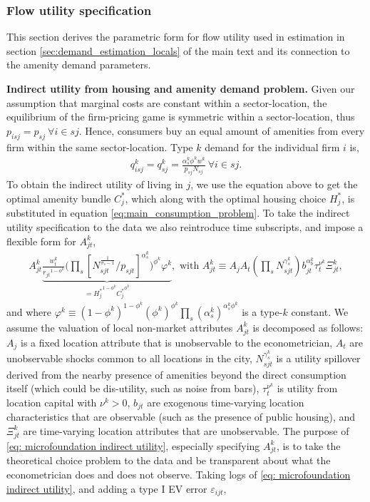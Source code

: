 \documentclass[11pt]{article}
\newcommand{\Paragraph}{\vspace{0.1cm}\noindent\textbf}
\begin{document}
\subsubsection{Flow utility specification}\label{sec: appendix microfoundation-flow utility}

This section derives the parametric form for flow utility used in estimation in section \ref{sec:demand_estimation_locals} of the main text and its connection to the amenity demand parameters.

\Paragraph{Indirect utility from housing and amenity demand problem.} Given our assumption that marginal costs are constant within a sector-location, the equilibrium of the firm-pricing game is symmetric within a sector-location, thus $p_{isj}=p_{sj} \ \forall i \in sj$. Hence, consumers buy an equal amount of amenities from every firm within the same sector-location. Type $k$ demand for the individual firm $i$ is,
\begin{align}\label{eq:optimal_amenity_choice}
    q_{isj}^k = q_{sj}^k = \frac{\alpha^k_{s} \phi^k w^k}{p_{sj}N_{sj}} \ \forall i \in sj.
\end{align}
To obtain the indirect utility of living in $j$, we use the equation above to get the optimal amenity bundle $C_{j}^*$, which along with the optimal housing choice $H_{j}^*$, is substituted in equation \eqref{eq:main_consumption_problem}. To take the indirect utility specification to the data we also reintroduce time subscripts, and impose a flexible form for $A_{jt}^k$,
\begin{align}\label{eq: microfoundation indirect utility}
A_{jt}^k  \underbrace{\frac{w_t^k}{{r_{jt}}^{1-\phi^k}}   \Bigg(\prod_s\left[  N_{sjt}^{\frac{1}{\sigma_s-1}} / p_{sjt} \right]^{\alpha^k_{s}}\Bigg)^{\phi^k} \varphi^k}_{ ={H_{j}^*}^{1-\phi^k} {C_{j}^*}^{\phi^k}  } ,  \text{ with }  A_{jt}^k \equiv A_jA_t \left(\prod_s N_{sjt}^{\gamma_s^k}\right) b_{jt}^{\alpha^k_b} \tau^{\nu^k}_t \Xi_{jt}^k,
\end{align}
and where $\varphi^k \equiv  (1-\phi^k)^{1-\phi^k} (\phi^k)^{\phi^k} \prod_s (\alpha^k_s)^{\alpha^k_s \phi^k}$ is a type-$k$ constant. We assume the valuation of local non-market attributes $A_{jt}^k$ is decomposed as follows: $A_j$ is a fixed location attribute that is unobservable to the econometrician, $A_t$ are unobservable shocks common to all locations in the city, $N_{sjt}^{\gamma_s^k}$ is a utility spillover derived from the nearby presence of amenities beyond the direct consumption itself (which could be dis-utility, such as noise from bars), $\tau^{\nu^k}_t$ is utility from location capital with $\nu^k>0$, $b_{jt}$ are exogenous time-varying location characteristics that are observable (such as the presence of public housing), and $\Xi_{jt}^k$ are time-varying location attributes that are unobservable. The purpose of \ref{eq: microfoundation indirect utility}, especially specifying  $A_{jt}^k$, is to take the theoretical choice problem to the data and be transparent about what the econometrician does and does not observe. Taking logs of \ref{eq: microfoundation indirect utility}, and adding a type I EV error $\varepsilon_{ijt}$,
\end{document}
